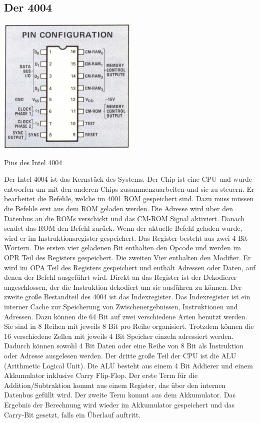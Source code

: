 \subsection{Der 4004}
\begin{floatingfigure}[Hr]{.5\textwidth}
	\vspace{-10pt}
	\includegraphics[width=0.5\textwidth]{figures/pins_4004.png}
	\caption{Pins des Intel 4004}
	\label{fig:pins_4004}
\end{floatingfigure}
Der Intel 4004 ist das Kernstück des Systems. Der Chip ist eine CPU und wurde entworfen um mit den anderen Chips zusammenzuarbeiten und sie zu steuern. Er bearbeitet die Befehle, welche im 4001 ROM gespeichert sind. Dazu muss müssen die Befehle erst aus dem ROM geladen werden.
Die Adresse wird über den Datenbus an die ROMs verschickt und das CM-ROM Signal aktiviert. Danach sendet das ROM den Befehl zurück. Wenn der aktuelle Befehl geladen wurde, wird er im Instruktionsregister gespeichert. Das Register besteht aus zwei 4 Bit Wörtern. 
Die ersten vier geladenen Bit enthalten den Opcode und werden im OPR Teil des Registers gespeichert. Die zweiten Vier enthalten den Modifier. Er wird im OPA Teil des Registers gespeichert und enthält Adressen oder Daten, auf denen der Befehl ausgeführt wird. Direkt an das Register ist der Dekodierer angeschlossen, der die Instruktion dekodiert um sie ausführen zu können. Der zweite große Bestandteil des 4004 ist das Indexregister.
 Das Indexregister ist ein interner Cache zur Speicherung von Zwischenergebnissen, Instruktionen und Adressen.
 Dazu können die 64 Bit auf zwei verschiedene Arten benutzt werden. Sie sind in 8 Reihen mit jeweils 8 Bit pro Reihe organisiert. Trotzdem können die 16 verschiedene Zellen mit jeweils 4 Bit Speicher einzeln adressiert werden. Dadurch können sowohl 4 Bit Daten oder eine Reihe von 8 Bit als Instruktion oder Adresse ausgelesen werden. 
Der dritte große Teil der CPU ist die ALU (Arithmetic Logical Unit). Die ALU besteht aus einem 4 Bit Addierer und einem Akkumulator inklusive Carry Flip-Flop. Der erste Term für die Addition/Subtraktion kommt aus einem Register, das über den internen Datenbus gefüllt wird. Der zweite Term kommt aus dem Akkumulator. Das Ergebnis der Berechnung wird wieder im Akkumulator gespeichert und das Carry-Bit gesetzt, falls ein Überlauf auftritt.
